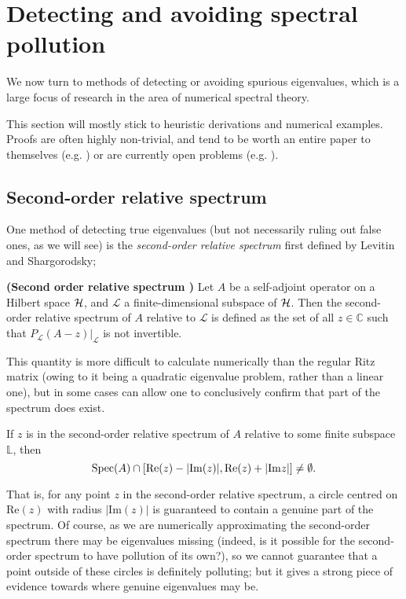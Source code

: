 \documentclass[../main.tex]{subfiles}
\begin{document}
\section{Detecting and avoiding spectral pollution}

We now turn to methods of detecting or
avoiding spurious eigenvalues, which is a large focus of research in the area of
numerical spectral theory.

This section will mostly stick to heuristic derivations and numerical examples.
Proofs are often highly non-trivial, and tend to be worth an entire paper to
themselves (e.g. \cite{soussi2006convergence}) or are currently open problems
(e.g. \cite{chandler-wilde2012spectrum}).

\subsection{Second-order relative spectrum}
One method of detecting true eigenvalues (but not necessarily ruling out false ones,
as we will see) is the \emph{second-order relative spectrum} first defined by Levitin and Shargorodsky;

\begin{definition}{\textbf{(Second order relative spectrum \cite{levitin2002spectral})}}
  Let $A$ be a self-adjoint operator on a Hilbert space $\mathcal{H}$, and 
  $\mathcal{L}$ a finite-dimensional subspace of $\mathcal{H}$. Then the second-order relative
  spectrum of $A$ relative to $\mathcal{L}$ is defined as the set of all $z \in \mathbb{C}$
  such that $P_{\mathcal{L}}(A - z)\big|_{\mathcal{L}}$ is not invertible.
\end{definition}

This quantity is more difficult to calculate numerically than the regular Ritz matrix (owing to
it being a quadratic eigenvalue problem, rather than a linear one), but in some cases can allow
one to conclusively confirm that part of the spectrum does exist.

\begin{theorem}
  If $z$ is in the second-order relative spectrum of $A$ relative to some finite subspace $\mathbb{L}$,
  then
    $$\mathrm{Spec}(A) \cap [\mathrm{Re}(z) - |\mathrm{Im}(z)|, \mathrm{Re}(z) + |\mathrm{Im}z|] 
    \neq \emptyset.$$
\end{theorem}

That is, for any point $z$ in the second-order relative spectrum,
a circle centred on $\mathrm{Re}(z)$ with radius $|\mathrm{Im}(z)|$ is guaranteed to contain
a genuine part of the spectrum. Of course, as we are numerically approximating the second-order
spectrum there may be eigenvalues missing (indeed, is it possible for the second-order spectrum to
have pollution of its own?), so we cannot guarantee that a point outside of these circles is
definitely polluting; but it gives a strong piece of evidence towards where genuine eigenvalues
may be.
\end{document}
